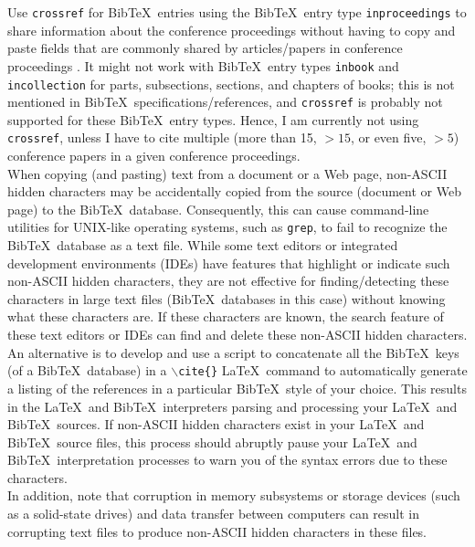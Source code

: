 \documentclass[letter,12pt]{article}
\begin{document}
Use {\tt crossref} for {\sc Bib}\TeX\ entries using the {\sc Bib}\TeX\ entry type {\tt inproceedings} to share information about the conference proceedings without having to copy and paste fields that are commonly shared by articles/papers in conference proceedings \cite[\S12.2.3, pp. 234]{Kopka2004}. It might not work with {\sc Bib}\TeX\ entry types {\tt inbook} and {\tt incollection} for parts, subsections, sections, and chapters of books; this is not mentioned in {\sc Bib}\TeX\ specifications/references, and {\tt crossref} is probably not supported for these {\sc Bib}\TeX\ entry types. Hence, I am currently not using {\tt crossref}, unless I have to cite multiple (more than 15, $>15$, or even five, $>5$) conference papers in a given conference proceedings. \\



When copying (and pasting) text from a document or a Web page, non-ASCII hidden characters may be accidentally copied from the source (document or Web page) to the {\sc Bib}\TeX\ database. Consequently, this can cause command-line utilities for UNIX-like operating systems, such as {\tt grep}, to fail to recognize the {\sc Bib}\TeX\ database as a text file. While some text editors or integrated development environments (IDEs) have features that highlight or indicate such non-ASCII hidden characters, they are not effective for finding/detecting these characters in large text files ({\sc Bib}\TeX\ databases in this case) without knowing what these characters are. If these characters are known, the search feature of these text editors or IDEs can find and delete these non-ASCII hidden characters. \\

An alternative is to develop and use a script to concatenate all the {\sc Bib}\TeX\ keys (of a {\sc Bib}\TeX\ database) in a {\tt $\backslash$cite\{\}} \LaTeX\ command to automatically generate a listing of the references in a particular {\sc Bib}\TeX\ style of your choice. This results in the \LaTeX\ and {\sc Bib}\TeX\ interpreters parsing and processing your \LaTeX\ and {\sc Bib}\TeX\ sources. If non-ASCII hidden characters exist in your \LaTeX\ and {\sc Bib}\TeX\ source files, this process should abruptly pause your \LaTeX\ and {\sc Bib}\TeX\ interpretation processes to warn you of the syntax errors due to these characters. \\

In addition, note that corruption in memory subsystems or storage devices (such as a solid-state drives) and data transfer between computers can result in corrupting text files to produce non-ASCII hidden characters in these files.
\end{document}
